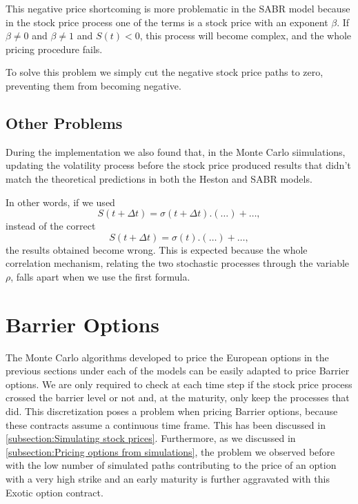 This negative price shortcoming is more problematic in the SABR model because in the stock price process one of the terms is a stock price with an exponent $\beta$. If $\beta\neq0$ and $\beta\neq1$ and $S(t)<0$, this process will become complex, and the whole pricing procedure fails.

To solve this problem we simply cut the negative stock price paths to zero, preventing them from becoming negative.



\subsection{Other Problems}
During the implementation we also found that, in the Monte Carlo siimulations, updating the volatility process before the stock price produced results that didn't match the theoretical predictions in both the Heston and SABR models.

In other words, if we used
\begin{equation}
S(t+\Delta t)=\sigma(t+\Delta t).\left(\ldots\right)+\ldots,
\end{equation}
instead of the correct
\begin{equation}
S(t+\Delta t)=\sigma(t).\left(\ldots\right)+\ldots,
\end{equation}
\noindent the results obtained become wrong.
This is expected because the whole correlation mechanism, relating the two stochastic processes through the variable $\rho$, falls apart when we use the first formula.

\section{Barrier Options}

The Monte Carlo algorithms developed to price the European options in the previous sections under each of the models can be easily adapted to price Barrier options.
We are only required to check at each time step if the stock price process crossed the barrier level or not and, at the maturity, only keep the processes that did. This discretization poses a problem when pricing Barrier options, because these contracts assume a continuous time frame. This has been discussed in \autoref{subsection:Simulating stock prices}. Furthermore, as we discussed in \autoref{subsection:Pricing options from simulations}, the problem we observed before with the low number of simulated paths contributing to the price of an option with a very high strike and an early maturity is further aggravated with this Exotic option contract.

